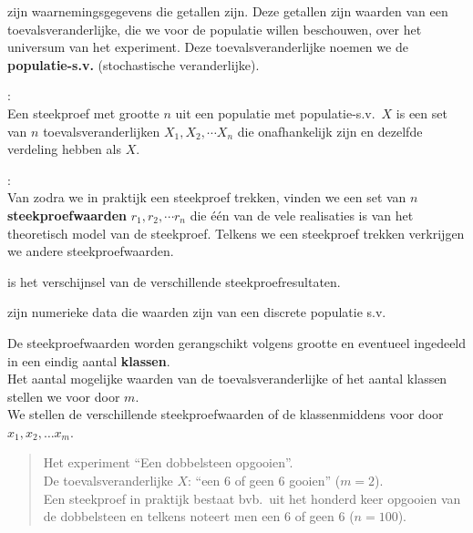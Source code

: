 \begin{small}
\begin{description}
\item[Kwantitatieve of numerieke data] zijn  waarnemingsgegevens die getallen zijn. Deze getallen zijn waarden van een toevalsveranderlijke, die we voor de populatie willen beschouwen, over het universum van het experiment. Deze toevalsveranderlijke  noemen we de \textbf{populatie-s.v.} (stochastische veranderlijke). 
 
\item[Het theoretisch model van een steekproef]:\\
Een steekproef met grootte $n$ uit een populatie met populatie-s.v.\ $X$ is een set van $n$ toevalsveranderlijken $X_1, X_2,\cdots  X_n$ die onafhankelijk zijn en dezelfde verdeling hebben als $X$.

\item[Een steekproef in praktijk]:\\
Van zodra we in praktijk een steekproef trekken, vinden we een set van  $n$ \textbf{steekproefwaarden} $r_1, r_2, \cdots r_n$ die \'e\'en van de vele realisaties is van het theoretisch model van de steekproef. Telkens we een steekproef trekken verkrijgen we andere steekproefwaarden.
\item[Steekproefvariabiliteit] is het verschijnsel van de verschillende steekproefresultaten.

\item[Discrete kwantitatieve data] zijn numerieke data die waarden zijn van een discrete populatie s.v.

De  steekproefwaarden worden  gerangschikt volgens grootte en eventueel  ingedeeld in een eindig aantal {\bf klassen}. \\
Het aantal mogelijke waarden van de toevalsveranderlijke   of het aantal klassen stellen we voor door $m$.\\  We stellen de verschillende steekproefwaarden of de klassenmiddens voor door $x_1, x_2,\ldots x_m$.
\begin{quotation}
\item Het experiment ``Een dobbelsteen opgooien''.\\
De toevalsveranderlijke $X$: ``een 6 of geen 6 gooien'' ($m=2$).\\ Een  steekproef in praktijk bestaat bvb.\ uit het honderd keer opgooien van de dobbelsteen en telkens noteert men een 6 of geen 6 ($n= 100$).


\end{quotation}
\end{description}
\end{small}
